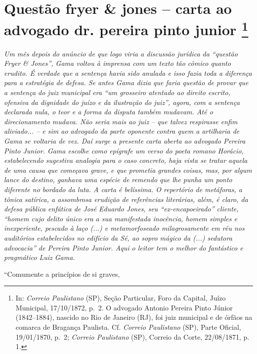 \chapter{Questão fryer \& jones -- carta ao advogado dr. pereira pinto junior
\footnote{ In: \emph{Correio Paulistano} (SP), Seção Particular, Foro
  da Capital, Juízo Municipal, 17/10/1872, p.~2. O advogado Antonio
  Pereira Pinto Júnior (1842--1884), nascido no Rio de Janeiro (RJ), foi
  juiz municipal e de órfãos na comarca de Bragança Paulista. Cf.
  \emph{Correio Paulistano} (SP), Parte Oficial, 19/01/1870, p.~2;
  \emph{Correio Paulistano} (SP), Correio da Corte, 22/08/1871, p.~ 1.}} %

\begin{didascalia}
\emph{Um mês depois do anúncio de que logo viria a discussão jurídica da
``questão Fryer \& Jones'', Gama voltou à imprensa com um texto tão cômico
quanto erudito. É verdade que a sentença havia sido anulada e isso fazia
toda a diferença para a estratégia de defesa. Se antes Gama dizia que
faria questão de provar que a sentença do juiz municipal era ``um
grosseiro atentado ao direito escrito, ofensiva da dignidade do juízo e
da ilustração do juiz'', agora, com a sentença declarada nula, o teor e a
forma da disputa também mudavam. Até o direcionamento mudava. Não seria
mais ao juiz -- que talvez respirasse enfim aliviado... -- e sim ao
advogado da parte oponente contra quem a artilharia de Gama se voltaria
de vez. Daí surge a presente carta aberta ao advogado Pereira Pinto
Junior. Gama escolhe como epígrafe um verso do poeta romano Horácio,
estabelecendo sugestiva analogia para o caso concreto, haja vista se
tratar aquela de uma causa que começava grave, e que prometia grandes
coisas, mas, por algum lance do destino, ganhava uma espécie de remendo
que lhe punha um ponto diferente no bordado da luta. A carta é
belíssima. O repertório de metáforas, a tônica satírica, a assombrosa
erudição de referências literárias, além, é claro, da defesa pública
enfática de José Eduardo Jones, seu ``ex-encapoeirado'' cliente, ``homem
cujo delito único era a sua manifestada inocência, homem simples e
inexperiente, pescado à laço (...) e metamorfoseado milagrosamente em
réu nos auditórios estabelecidos no edifício da Sé, ao sopro mágico da
(...) sedutora advocacia'' de Pereira Pinto Junior. Aqui o leitor tem o
melhor do fantástico e pragmático Luiz Gama.}
\end{didascalia}

\asterisc{}

``Comumente a princípios de si graves,

